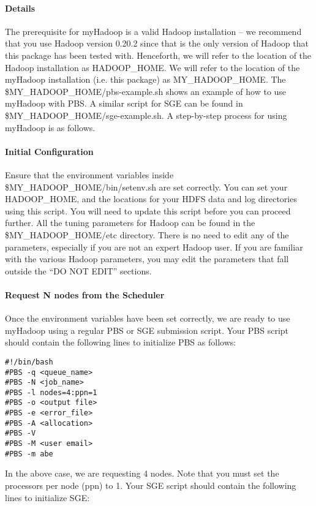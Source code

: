 \paragraph{Details}

The prerequisite for myHadoop is a valid Hadoop installation – we recommend that you
use Hadoop version 0.20.2 since that is the only version of Hadoop that this package has
been tested with. Henceforth, we will refer to the location of the Hadoop installation as
HADOOP\_HOME. We will refer to the location of the myHadoop installation (i.e. this
package) as MY\_HADOOP\_HOME. The \$MY\_HADOOP\_HOME/pbs-example.sh shows
an example of how to use myHadoop with PBS. A similar script for SGE can be found in
\$MY\_HADOOP\_HOME/sge-example.sh.
A step-by-step process for using myHadoop is as follows.

\paragraph{Initial Configuration}

Ensure that the environment variables inside \$MY\_HADOOP\_HOME/bin/setenv.sh are
set correctly. You can set your HADOOP\_HOME, and the locations for your HDFS data
and log directories using this script. You will need to update this script before you can
proceed further.
All the tuning parameters for Hadoop can be found in the \$MY\_HADOOP\_HOME/etc
directory. There is no need to edit any of the parameters, especially if you are not an
expert Hadoop user. If you are familiar with the various Hadoop parameters, you may
edit the parameters that fall outside the “DO NOT EDIT” sections.

\paragraph{Request N nodes from the Scheduler}

Once the environment variables have been set correctly, we are ready to use myHadoop
using a regular PBS or SGE submission script. Your PBS script should contain the
following lines to initialize PBS as follows:

\begin{verbatim}
#!/bin/bash
#PBS -q <queue_name>
#PBS -N <job_name>
#PBS -l nodes=4:ppn=1
#PBS -o <output file>
#PBS -e <error_file>
#PBS -A <allocation>
#PBS -V
#PBS -M <user email>
#PBS -m abe
\end{verbatim}

In the above case, we are requesting 4 nodes. Note that you must set the processors per
node (ppn) to 1.
Your SGE script should contain the following lines to initialize SGE:

